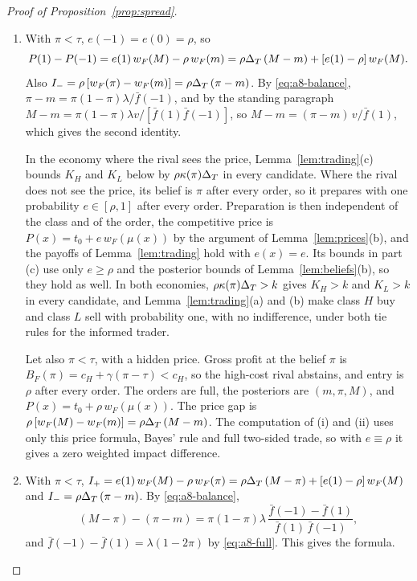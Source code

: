 \begin{proof}[Proof of Proposition~\ref{prop:spread}]
\begin{enumerate}[label=(\roman*),leftmargin=2em]
posterior for every \(e(0)\in[\rho,1]\), so the paragraph on constructed tuples in Appendix~\ref{app:beliefs} supplies
the prices, the preparation rule and the price beliefs, and (E3) holds at the posterior \(\tau\). Full two-sided trade
is therefore an equilibrium with one such \(e(0)\) exactly when it is an equilibrium with every such \(e(0)\). By
(ii), the weighted impact difference is \(\bar f(1)\,[1-e(0)]\,w_F(M)-\bar f(-1)\,[e(0)-\rho]\,w_F(m)\), which is affine
and strictly decreasing in \(e(0)\), with the value \((1-\rho)\,\bar f(1)\,w_F(M)\) at \(e(0)=\rho\) and
\(-(1-\rho)\,\bar f(-1)\,w_F(m)\) at \(e(0)=1\).
\item With \(\pi<\tau\), \(e(-1)=e(0)=\rho\), so
\[
P(1)-P(-1)=e(1)\,w_F(M)-\rho\,w_F(m)=\rho\Delta_T\,(M-m)+[e(1)-\rho]\,w_F(M).
\]
Also \(I_-=\rho\,[w_F(\pi)-w_F(m)]=\rho\Delta_T\,(\pi-m)\). By \eqref{eq:a8-balance},
\(\pi-m=\pi(1-\pi)\lambda/\bar f(-1)\), and by the standing paragraph
\(M-m=\pi(1-\pi)\lambda v/[\bar f(1)\bar f(-1)]\), so \(M-m=(\pi-m)\,v/\bar f(1)\), which gives the second identity.

In the economy where the rival sees the price, Lemma~\ref{lem:trading}(c) bounds \(K_H\) and \(K_L\) below by
\(\rho\kappa(\pi)\Delta_T\) in every candidate. Where the rival does not see the price, its belief is \(\pi\) after
every order, so it prepares with one probability \(e\in[\rho,1]\) after every order. Preparation is then independent
of the class and of the order, the competitive price is \(P(x)=t_0+e\,w_F(\mu(x))\) by the argument of
Lemma~\ref{lem:prices}(b), and the payoffs of Lemma~\ref{lem:trading} hold with \(e(x)=e\). Its bounds in part (c)
use only \(e\ge\rho\) and the posterior bounds of Lemma~\ref{lem:beliefs}(b), so they hold as well. In both economies,
\(\rho\kappa(\pi)\Delta_T>k\) gives \(K_H>k\) and \(K_L>k\) in every candidate, and Lemma~\ref{lem:trading}(a) and (b) make
class \(H\) buy and class \(L\) sell with probability one, with no indifference, under both tie rules for the informed trader.

Let also \(\pi<\tau\), with a hidden price. Gross profit at the belief \(\pi\) is \(B_F(\pi)=c_H+\gamma(\pi-\tau)<c_H\),
so the high-cost rival abstains, and entry is \(\rho\) after every order. The orders are full, the posteriors are
\((m,\pi,M)\), and \(P(x)=t_0+\rho\,w_F(\mu(x))\). The price gap is \(\rho\,[w_F(M)-w_F(m)]=\rho\Delta_T\,(M-m)\). The
computation of (i) and (ii) uses only this price formula, Bayes' rule and full two-sided trade, so with \(e\equiv\rho\)
it gives a zero weighted impact difference.
\item With \(\pi<\tau\), \(I_+=e(1)\,w_F(M)-\rho\,w_F(\pi)=\rho\Delta_T\,(M-\pi)+[e(1)-\rho]\,w_F(M)\) and
\(I_-=\rho\Delta_T\,(\pi-m)\). By \eqref{eq:a8-balance},
\[
(M-\pi)-(\pi-m)=\pi(1-\pi)\lambda\,\frac{\bar f(-1)-\bar f(1)}{\bar f(1)\,\bar f(-1)},
\]
and \(\bar f(-1)-\bar f(1)=\lambda(1-2\pi)\) by \eqref{eq:a8-full}. This gives the formula.


\end{enumerate}
\end{proof}

